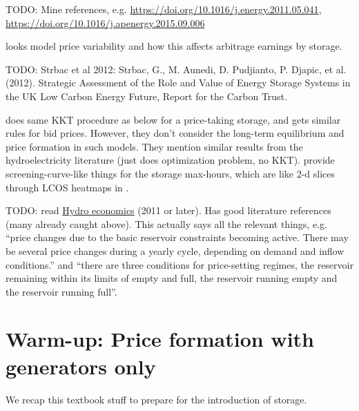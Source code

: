 \documentclass[final,3p,times]{elsarticle}
\begin{document}
TODO: Mine \cite{Ward2018} references, e.g.
\url{https://doi.org/10.1016/j.energy.2011.05.041},
\url{https://doi.org/10.1016/j.apenergy.2015.09.006}

\cite{Ward2019} looks model price variability and how this affects arbitrage
earnings by storage.

TODO: Strbac et al 2012: Strbac, G., M. Aunedi, D. Pudjianto, P. Djapic, et al.
(2012). Strategic Assessment of the Role and Value of Energy Storage Systems in
the UK Low Carbon Energy Future, Report for the Carbon Trust.

\cite{CRAMPES2019100746} does same KKT procedure as below for a price-taking
storage, and gets similar rules for bid prices. However, they don't consider the
long-term equilibrium and price formation in such models. They mention similar
results from the hydroelectricity literature \cite{lederer1984overall} (just
does optimization problem, no KKT). \cite{CRAMPES2019100746} provide
screening-curve-like things for the storage max-hours, which are like 2-d slices
through LCOS heatmaps in \cite{schmidtmelchior2019}.

TODO: read
\href{https://www.uio.no/studier/emner/sv/oekonomi/ECON4930/v11/undervisningsmateriale/Hydropower%20economics4.pdf}{Hydro
  economics} (2011 or later). Has good literature references (many already
caught above). This actually says all the relevant things, e.g. ``price changes
due to the basic reservoir constraints becoming active.  There may be several
price changes during a yearly cycle, depending on demand and inflow
conditions.'' and ``there are three conditions for price-setting regimes, the
reservoir remaining within its limits of empty and full, the reservoir running
empty and the reservoir running full''.

\section{Warm-up: Price formation with generators only}\label{sec:generators}

We recap this textbook stuff to prepare for the introduction of storage.
\end{document}
